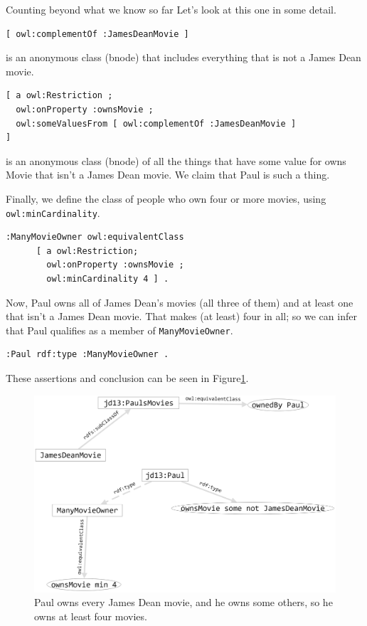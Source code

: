 \begin{challenge}{Counting beyond what we know so far}
Let's look at this one in some detail.

\begin{lstlisting}
[ owl:complementOf :JamesDeanMovie ]
\end{lstlisting}

is an anonymous class (bnode) that includes everything that is not a
James Dean movie.

\begin{lstlisting}
[ a owl:Restriction ;
  owl:onProperty :ownsMovie ;
  owl:someValuesFrom [ owl:complementOf :JamesDeanMovie ]
]
\end{lstlisting}

is an anonymous class (bnode) of all the things that have some value for
owns Movie that isn't a James Dean movie. We claim that Paul is such a
thing.

Finally, we define the class of people who own four or more movies,
using \texttt{owl:minCardinality}.

\begin{lstlisting}
:ManyMovieOwner owl:equivalentClass
      [ a owl:Restriction;
        owl:onProperty :ownsMovie ;
        owl:minCardinality 4 ] .
\end{lstlisting}

Now, Paul owns all of James Dean's movies (all three of them) and at
least one that isn't a James Dean movie. That makes (at least) four in
all; so we can infer that Paul qualifies as a member of \texttt{ManyMovieOwner}.

\begin{lstlisting}
:Paul rdf:type :ManyMovieOwner .
\end{lstlisting}

These assertions and conclusion can be seen in Figure\ref{fig:ch13.05}.

\begin{figure}
\centering
\includegraphics[width=5in]{SWWOv3/media/ch13/figure13-5.png}
\caption{Paul owns every James Dean movie, and he owns some others, so he owns at
least four movies.
}
\label{fig:ch13.05}
\end{figure}

\end{challenge}

